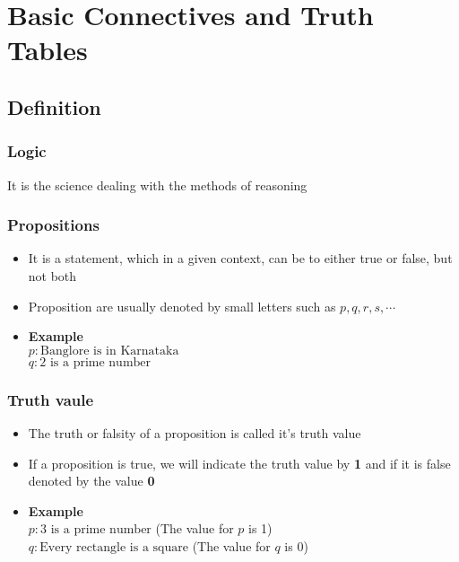 \documentclass{article}
\begin{document}
	\section{Basic Connectives and Truth Tables}
	\subsection{Definition}
	\subsubsection{Logic}
	It is the science dealing with the methods of reasoning

	\subsubsection{Propositions}
	\begin{itemize}
		\item It is a statement, which in a given context, can be to either true or false, but not both
		\item Proposition are usually denoted by small letters such as $p,q,r,s,\cdots$
		\item \textbf{Example} \\
			$p : \text{Banglore is in Karnataka}$ \\
			$q : \text{2 is a prime number}$
	\end{itemize}

	\subsubsection{Truth vaule}
	\begin{itemize}
		\item The truth or falsity of a proposition is called it's truth value
		\item If a proposition is true, we will indicate the truth value by \textbf{1} and
			if it is false denoted by the value \textbf{0}
		\item \textbf{Example} \\
			$p : \text{3 is a prime number}$ (The value for $p$ is 1) \\
			$q : \text{Every rectangle is a square}$ (The value for $q$ is 0)
	\end{itemize}
\end{document}
